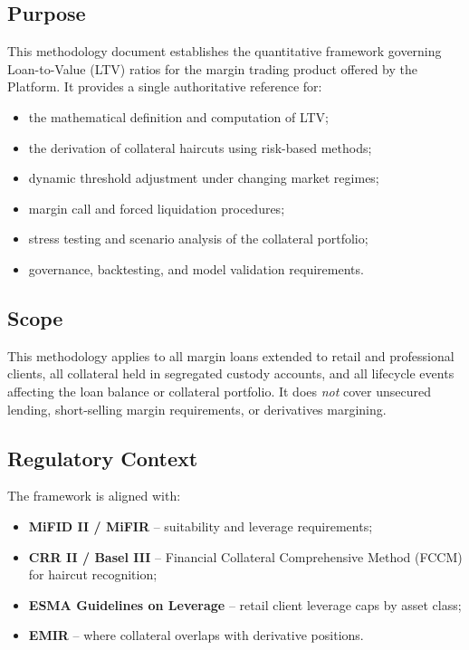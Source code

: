 \documentclass[12pt, a4paper]{article}
\newcommand{\1}{\mathbbm{1}}
\begin{document}
\subsection{Purpose}
This methodology document establishes the quantitative framework governing
Loan-to-Value (LTV) ratios for the margin trading product offered by the Platform.
It provides a single authoritative reference for:
\begin{itemize}[leftmargin=1.5em]
    \item the mathematical definition and computation of LTV;
    \item the derivation of collateral haircuts using risk-based methods;
    \item dynamic threshold adjustment under changing market regimes;
    \item margin call and forced liquidation procedures;
    \item stress testing and scenario analysis of the collateral portfolio;
    \item governance, backtesting, and model validation requirements.
\end{itemize}

\subsection{Scope}
This methodology applies to all margin loans extended to retail and professional
clients, all collateral held in segregated custody accounts, and all lifecycle
events affecting the loan balance or collateral portfolio. It does \emph{not} cover
unsecured lending, short-selling margin requirements, or derivatives margining.

\subsection{Regulatory Context}
The framework is aligned with:
\begin{itemize}[leftmargin=1.5em]
    \item \textbf{MiFID II / MiFIR} -- suitability and leverage requirements;
    \item \textbf{CRR II / Basel III} -- Financial Collateral Comprehensive Method (FCCM) for haircut recognition;
    \item \textbf{ESMA Guidelines on Leverage} -- retail client leverage caps by asset class;
    \item \textbf{EMIR} -- where collateral overlaps with derivative positions.
\end{itemize}
\end{document}
